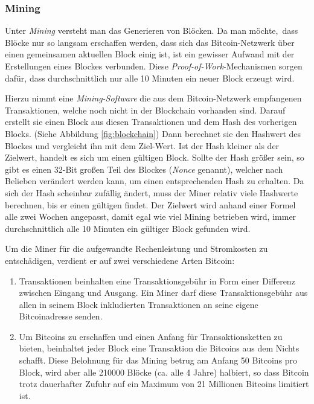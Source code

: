 \subsubsection{Mining}
\label{subsec:mining}

Unter \emph{Mining} versteht man das Generieren von Blöcken.
Da man möchte, dass Blöcke nur so langsam erschaffen werden, dass sich das Bitcoin-Netzwerk über einen gemeinsamen aktuellen Block einig ist, ist ein gewisser Aufwand mit der Erstellungen eines Blockes verbunden.
Diese \emph{Proof-of-Work}-Mechanismen sorgen dafür, dass durchschnittlich nur alle 10 Minuten ein neuer Block erzeugt wird.

Hierzu nimmt eine \emph{Mining-Software} die aus dem Bitcoin-Netzwerk empfangenen Transaktionen, welche noch nicht in der Blockchain vorhanden sind.
Darauf erstellt sie einen Block aus diesen Transaktionen und dem Hash des vorherigen Blocks.
(Siehe Abbildung \ref{fig:blockchain})
Dann berechnet sie den Hashwert des Blockes und vergleicht ihn mit dem Ziel-Wert.
Ist der Hash kleiner als der Zielwert, handelt es sich um einen gültigen Block.
Sollte der Hash größer sein, so gibt es einen 32-Bit großen Teil des Blockes (\emph{Nonce} genannt), welcher nach Belieben verändert werden kann, um einen entsprechenden Hash zu erhalten.
Da sich der Hash scheinbar zufällig ändert, muss der Miner relativ viele Hashwerte berechnen, bis er einen gültigen findet.
Der Zielwert wird anhand einer Formel alle zwei Wochen angepasst, damit egal wie viel Mining betrieben wird, immer durchschnittlich alle 10 Minuten ein gültiger Block gefunden wird.

Um die Miner für die aufgewandte Rechenleistung und Stromkosten zu entschädigen, verdient er auf zwei verschiedene Arten Bitcoin:
\begin{enumerate}
    \item Transaktionen beinhalten eine Transaktionsgebühr in Form einer Differenz zwischen Eingang und Ausgang.
    Ein Miner darf diese Transaktionsgebühr aus allen in seinem Block inkludierten Transaktionen an seine eigene Bitcoinadresse senden.
    \item Um Bitcoins zu erschaffen und einen Anfang für Transaktionsketten zu bieten, beinhaltet jeder Block eine Transaktion die Bitcoins aus dem Nichts schafft.
    Diese Belohnung für das Mining betrug am Anfang 50 Bitcoins pro Block, wird aber alle 210000 Blöcke (ca. alle 4 Jahre) halbiert, so dass Bitcoin trotz dauerhafter Zufuhr auf ein Maximum von 21 Millionen Bitcoins limitiert ist.
\end{enumerate}

